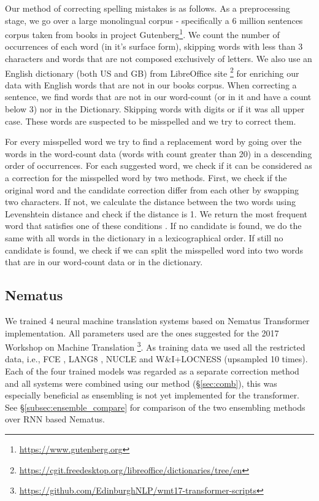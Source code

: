 \documentclass[11pt,a4paper]{article}
\begin{document}
Our method of correcting spelling mistakes is as follows. As a preprocessing stage, we go over a large monolingual corpus - specifically a 6 million sentences corpus taken from books in project Gutenberg\footnote{\url{https://www.gutenberg.org}}. We count the number of occurrences of each word (in it's surface form), skipping words with less than 3 characters and words that are not composed exclusively of letters.
We also use an English dictionary (both US and GB) from LibreOffice site \footnote{\url{https://cgit.freedesktop.org/libreoffice/dictionaries/tree/en}} for enriching our data with English words that are not in our books corpus.
When correcting a sentence, we find words that are not in our word-count (or in it and have a count below 3) nor in the Dictionary. Skipping words with digits or if it was all upper case. These words are suspected to be misspelled and we try to correct them.

For every misspelled word we try to find a replacement word by going over the words in the word-count data (words with count greater than 20) in a descending order of occurrences. For each suggested word, we check if it can be considered as a correction for the misspelled word by two methods. First, we check if the original word and the candidate correction differ from each other by swapping two characters. If not, we calculate the distance between the two words using Levenshtein distance \cite{Levenshtein1966BinaryCC} and check if the distance is 1. We return the most frequent word that satisfies one of these conditions . If no candidate is found, we do the same with all words in the dictionary in a lexicographical order. If still no candidate is found, we check if we can split the misspelled word into two words that are in our word-count data or in the dictionary.

\subsection{Nematus}
We trained 4 neural machine translation systems based on Nematus \cite{sennrich2017EACLDemo} Transformer \cite{Vaswani2017Attention} implementation. All parameters used are the ones suggested for the 2017 Workshop on Machine Translation \footnote{\url{https://github.com/EdinburghNLP/wmt17-transformer-scripts}}. As training data we used all the restricted data, i.e., FCE \cite{dale2011helping}, LANG8 \cite{mizumoto2011mining}, NUCLE \cite{dahlmeier2013building} and W\&I+LOCNESS \cite{bea2019, Granger1998TheCL} (upsampled 10 times). Each of the four trained models was regarded as a separate correction method and all systems were combined using our method (\S \ref{sec:comb}), this was especially beneficial as ensembling is not yet implemented for the transformer. See \S \ref{subsec:ensemble_compare} for comparison of the two ensembling methods over RNN based Nematus.
\end{document}
